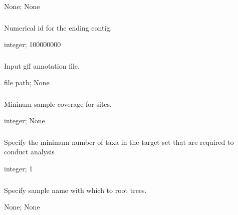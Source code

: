 \documentclass[letterpaper,11pt,english]{sphinxmanual}
\begin{document}
 None;  None


\subsubsection{}
\label{\detokenize{prog_desc:end-contig-endcontig}}
 Numerical id for the ending contig.

 integer;  100000000


\subsubsection{}
\label{\detokenize{prog_desc:id95}}
 Input gff annotation file.

 file path;  None


\subsubsection{}
\label{\detokenize{prog_desc:id96}}
 Mininum sample coverage for sites.

 integer;  None


\subsubsection{}
\label{\detokenize{prog_desc:num-target-species-targetspec}}
 Specify the minimum number of taxa in the target set that are required to conduct analysis

 integer;  1


\subsubsection{}
\label{\detokenize{prog_desc:outgroup}}
 Specify sample name with which to root trees.

 None;  None
\end{document}
